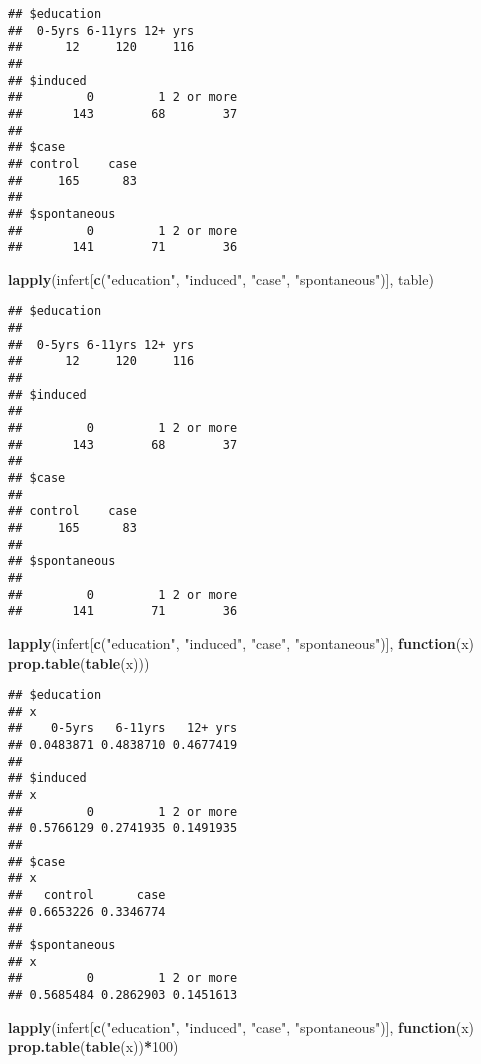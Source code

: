 \documentclass[]{book}
\newenvironment{Shaded}{\begin{snugshade}}{\end{snugshade}}
\newcommand{\KeywordTok}[1]{\textcolor[rgb]{0.13,0.29,0.53}{\textbf{#1}}}
\newcommand{\DecValTok}[1]{\textcolor[rgb]{0.00,0.00,0.81}{#1}}
\newcommand{\StringTok}[1]{\textcolor[rgb]{0.31,0.60,0.02}{#1}}
\newcommand{\ControlFlowTok}[1]{\textcolor[rgb]{0.13,0.29,0.53}{\textbf{#1}}}
\newcommand{\OperatorTok}[1]{\textcolor[rgb]{0.81,0.36,0.00}{\textbf{#1}}}
\newcommand{\NormalTok}[1]{#1}
\theoremstyle{definition}
\theoremstyle{definition}
\theoremstyle{remark}
\begin{document}
\begin{verbatim}
## $education
##  0-5yrs 6-11yrs 12+ yrs 
##      12     120     116 
## 
## $induced
##         0         1 2 or more 
##       143        68        37 
## 
## $case
## control    case 
##     165      83 
## 
## $spontaneous
##         0         1 2 or more 
##       141        71        36
\end{verbatim}

\begin{Shaded}
\begin{Highlighting}[]
\KeywordTok{lapply}\NormalTok{(infert[}\KeywordTok{c}\NormalTok{(}\StringTok{"education"}\NormalTok{, }\StringTok{"induced"}\NormalTok{, }\StringTok{"case"}\NormalTok{, }\StringTok{"spontaneous"}\NormalTok{)], table)}
\end{Highlighting}
\end{Shaded}

\begin{verbatim}
## $education
## 
##  0-5yrs 6-11yrs 12+ yrs 
##      12     120     116 
## 
## $induced
## 
##         0         1 2 or more 
##       143        68        37 
## 
## $case
## 
## control    case 
##     165      83 
## 
## $spontaneous
## 
##         0         1 2 or more 
##       141        71        36
\end{verbatim}

\begin{Shaded}
\begin{Highlighting}[]
\KeywordTok{lapply}\NormalTok{(infert[}\KeywordTok{c}\NormalTok{(}\StringTok{"education"}\NormalTok{, }\StringTok{"induced"}\NormalTok{, }\StringTok{"case"}\NormalTok{, }\StringTok{"spontaneous"}\NormalTok{)], }\ControlFlowTok{function}\NormalTok{(x) }\KeywordTok{prop.table}\NormalTok{(}\KeywordTok{table}\NormalTok{(x)))}
\end{Highlighting}
\end{Shaded}

\begin{verbatim}
## $education
## x
##    0-5yrs   6-11yrs   12+ yrs 
## 0.0483871 0.4838710 0.4677419 
## 
## $induced
## x
##         0         1 2 or more 
## 0.5766129 0.2741935 0.1491935 
## 
## $case
## x
##   control      case 
## 0.6653226 0.3346774 
## 
## $spontaneous
## x
##         0         1 2 or more 
## 0.5685484 0.2862903 0.1451613
\end{verbatim}

\begin{Shaded}
\begin{Highlighting}[]
\KeywordTok{lapply}\NormalTok{(infert[}\KeywordTok{c}\NormalTok{(}\StringTok{"education"}\NormalTok{, }\StringTok{"induced"}\NormalTok{, }\StringTok{"case"}\NormalTok{, }\StringTok{"spontaneous"}\NormalTok{)], }\ControlFlowTok{function}\NormalTok{(x) }\KeywordTok{prop.table}\NormalTok{(}\KeywordTok{table}\NormalTok{(x))}\OperatorTok{*}\DecValTok{100}\NormalTok{)}
\end{Highlighting}
\end{Shaded}
\end{document}
